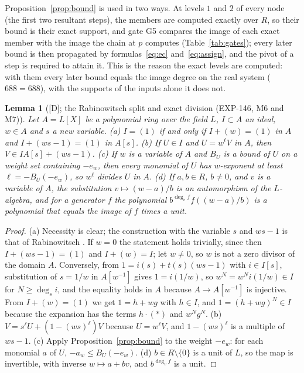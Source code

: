 \documentclass[11pt]{article}
\newtheorem{lemma}[theorem]{Lemma}
\theoremstyle{remark}
\begin{document}
Proposition~\ref{prop:bound} is used in two ways. At levels $1$ and $2$ of every node (the first two resultant steps), the members are computed exactly over $R$, so their bound is their exact support, and gate G5 compares the image of each exact member with the image the chain at $p$ computes
(Table~\ref{tab:gates}); every later bound is then propagated by formulas~\eqref{eq:ec} and~\eqref{eq:assign}, and the pivot of a step is required to attain it. This is the reason the exact levels are computed: with them every later bound equals the image degree on the real system ($688=688$), with the supports of the inputs alone it does not.

\begin{lemma}[{[D]}; the Rabinowitsch split and exact division (EXP-146, M6 and M7)]\label{lem:split}
Let $A=L[X]$ be a polynomial ring over the field $L$, $I\subset A$ an ideal, $w\in A$ and $s$ a new variable. (a) $I=(1)$ if and only if $I+(w)=(1)$ in $A$ and $I+(ws-1)=(1)$ in $A[s]$. (b) If $U\in I$ and $U=w^{\ell}V$ in $A$, then
$V\in I A[s]+(ws-1)$. (c) If $w$ is a variable of $A$ and $B_U$ is a bound of $U$ on a weight set containing $-e_w$, then every monomial of $U$ has $w$-exponent at least $\ell=-B_U(-e_w)$, so $w^{\ell}$ divides $U$ in $A$. (d) If $a,b\in R$, $b\ne0$, and $v$ is a variable of $A$, the substitution $v\mapsto(w-a)/b$ is an automorphism of the $L$-algebra, and for a generator
$f$ the polynomial $b^{\deg_vf}f((w-a)/b)$ is a polynomial that equals the image of $f$ times a unit.
\end{lemma}
\begin{proof}
(a) Necessity is clear; the construction with the variable $s$ and $ws-1$ is that of Rabinowitsch \cite{Rabinowitsch1930}. If $w=0$ the statement holds trivially, since then $I+(ws-1)=(1)$ and $I+(w)=I$; let $w\ne0$, so $w$ is not a zero divisor of the domain $A$. Conversely, from $1=i(s)+t(s)(ws-1)$ with $i\in I[s]$, substitution of $s=1/w$ in $A[w^{-1}]$ gives $1=i(1/w)$, so $w^N=w^Ni(1/w)\in I$ for $N\ge\deg_si$, and the equality holds in $A$ because $A\to A[w^{-1}]$ is injective. From $I+(w)=(1)$ we get $1=h+wg$ with $h\in I$,
and $1=(h+wg)^N\in I$ because the expansion has the terms $h\cdot(\ast)$ and $w^Ng^N$. (b) $V=s^{\ell}U+(1-(ws)^{\ell})V$ because $U=w^{\ell}V$, and $1-(ws)^{\ell}$ is a multiple of $ws-1$. (c) Apply Proposition~\ref{prop:bound} to the weight $-e_w$: for each monomial $a$ of $U$, $-a_w\le B_U(-e_w)$. (d) $b\in R\setminus\{0\}$ is a unit of $L$, so
the map is invertible, with inverse $w\mapsto a+bv$, and $b^{\deg_vf}$ is a unit.
\end{proof}
\end{document}
